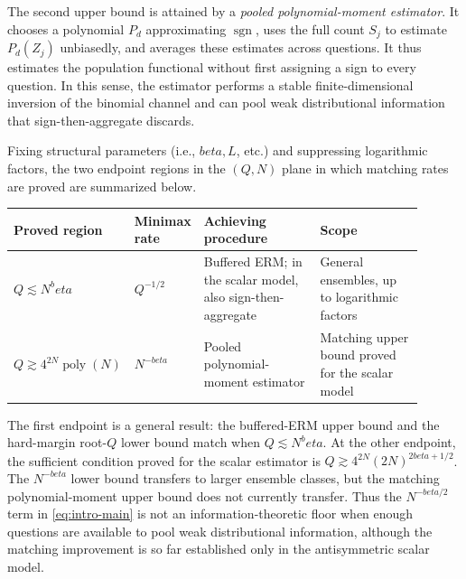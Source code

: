 \documentclass[11pt]{article}
\def\beta{beta}%
\newcommand{\sgn}{\operatorname{sgn}}
\begin{document}
The second upper bound is attained by a \emph{pooled polynomial-moment estimator}.  It chooses a polynomial $P_d$ approximating $\sgn$, uses the full count $S_j$ to estimate $P_d(Z_j)$ unbiasedly, and averages these estimates across questions.  It thus estimates the population functional without first assigning a sign to every question.  In this sense, the estimator performs a stable finite-dimensional inversion of the binomial channel and can pool weak distributional information that sign-then-aggregate discards.

Fixing structural parameters (i.e., $\beta, L$, etc.) and suppressing logarithmic factors, the two endpoint regions in the $(Q,N)$ plane in which matching rates are proved are summarized below.
\begin{center}
\small
\begin{tabular}{@{}L{0.18\linewidth}L{0.14\linewidth}L{0.31\linewidth}L{0.27\linewidth}@{}}
\toprule
Proved region & Minimax rate & Achieving procedure & Scope \\
\midrule
$Q\lesssim N^\beta$
& $Q^{-1/2}$
& Buffered ERM; in the scalar model, also sign-then-aggregate
& General ensembles, up to logarithmic factors \\
$Q\gtrsim 4^{2N}\operatorname{poly}(N)$
& $N^{-\beta}$
& Pooled polynomial-moment estimator
& Matching upper bound proved for the scalar model \\
\bottomrule
\end{tabular}
\end{center}
The first endpoint is a general result: the buffered-ERM upper bound and the hard-margin root-$Q$ lower bound match when $Q\lesssim N^\beta$.  At the other endpoint, the sufficient condition proved for the scalar estimator is $Q\gtrsim 4^{2N}(2N)^{2\beta+1/2}$.  The $N^{-\beta}$ lower bound transfers to larger ensemble classes, but the matching polynomial-moment upper bound does not currently transfer.  Thus the $N^{-\beta/2}$ term in \eqref{eq:intro-main} is not an information-theoretic floor when enough questions are available to pool weak distributional information, although the matching improvement is so far established only in the antisymmetric scalar model.
\end{document}
